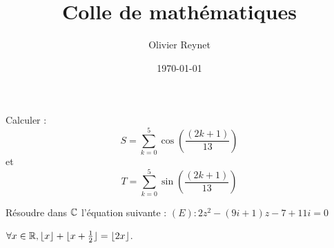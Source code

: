 \documentclass[french,12pt,a4paper]{article}
\author{Olivier Reynet}
\title{Colle de mathématiques}
\date{\today}
\begin{document}
\maketitle


\begin{exercise}[subtitle=Somme de cosinus]
	Calculer :
	$$S = \sum\limits_{k=0}^{5} \cos(\frac{(2k+1)}{13})$$
	et 
	$$T = \sum\limits_{k=0}^{5} \sin(\frac{(2k+1)}{13})$$
\end{exercise}



\begin{exercise}[subtitle= Résolution d'équation dans $\CC$]
	Résoudre dans $\CC$ l'équation suivante : 
	 $(E) : 2z^2-(9i+1)z-7+11i=0$
\end{exercise}

\begin{exercise}[subtitle= Partie entière]
 \Mq $\forall x \in \mathbb{R}, \lfloor x \rfloor + \lfloor x + \frac{1}{2} \rfloor = \lfloor 2 x \rfloor$.
\end{exercise}
\end{document}
